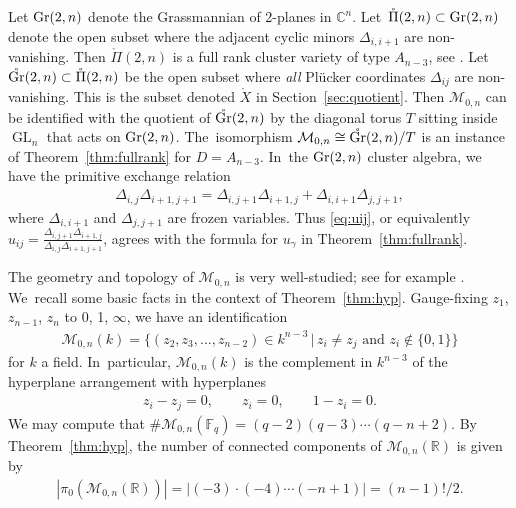 \documentclass[10pt,a4paper]{amsart}
\def\R{{\mathbb R}}
\def\C{{\mathbb C}}
\def\F{{\mathbb F}}
\def\Gr{{\rm Gr}}
\def\oPi{{\mathring{\Pi}}}
\def\oGr{{\mathring{\Gr}}}
\def\Xo{{\mathring{X}}}
\def\M{{\mathcal{M}}}
\def\GL{\operatorname{GL}}
\numberwithin{equation}{section}
\begin{document}
Let $\Gr(2,n)$ denote the Grassmannian of 2-planes in $\C^n$. Let~$\oPi(2,n)\subset \Gr(2,n)$ denote the open subset where the adjacent cyclic minors $\Delta_{i,i+1}$ are non-vanishing. Then $\oPi(2,n)$ is a full rank cluster variety of type $A_{n-3}$, see \cite[Section~12.2]{CA2}. Let~$\oGr(2,n) \subset \oPi(2,n)$ be the open subset where \emph{all} Pl\"ucker coordinates $\Delta_{ij}$ are non-vanishing. This is the subset denoted $\Xo$ in Section~\ref{sec:quotient}. Then $\M_{0,n}$ can be identified with the quotient of $\oGr(2,n)$ by the diagonal torus $T$ sitting inside $\GL_n$ that acts on $\Gr(2,n)$. The~isomorphism $\M_{0,n} \cong \oGr(2,n)/T$ is an instance of Theorem~\ref{thm:fullrank} for $D = A_{n-3}$. In~the $\Gr(2,n)$ cluster algebra, we have the primitive exchange relation
\begin{gather*}
\Delta_{i,j} \Delta_{i+1, j+1}= \Delta_{i, j+1}\Delta_{i+1,j} + \Delta_{i,i+1} \Delta_{j,j+1},
\end{gather*}
where $\Delta_{i,i+1}$ and $\Delta_{j,j+1}$ are frozen variables. Thus \eqref{eq:uij}, or equivalently $u_{ij} = \frac{ \Delta_{i, j+1}\Delta_{i+1,j} }{\Delta_{i,j} \Delta_{i+1, j+1}}$, agrees with the formula for $u_\gamma$ in Theorem~\ref{thm:fullrank}.

The geometry and topology of $\M_{0,n}$ is very well-studied; see for example \cite{Brown}. We~recall some basic facts in the context of Theorem~\ref{thm:hyp}. Gauge-fixing $z_1$, $z_{n-1}$, $z_n$ to 0, 1, $\infty$, we have an identification
\begin{gather*}
\M_{0,n}(k) = \big\{(z_2,z_3,\dots,z_{n-2})\in k^{n-3} \,|\, \mbox{$z_i \neq z_j$ and $z_i \notin \{0,1\}$}\big\}
\end{gather*}
for $k$ a field. In~particular, $\M_{0,n}(k)$ is the complement in $k^{n-3}$ of the hyperplane arrangement with hyperplanes
\begin{gather*}
z_i - z_j = 0, \qquad z_i = 0, \qquad 1-z_i =0.
\end{gather*}
We may compute that
$ \#\M_{0,n}(\F_q) = (q-2)(q-3)\cdots (q-n+2).
$
By Theorem~\ref{thm:hyp}, the number of connected components of $\M_{0,n}(\R)$ is given by
\begin{gather*}
|\pi_0(\M_{0,n}(\R))| = |(-3)\cdot (-4) \cdots (-n+1)| = (n-1)!/2.
\end{gather*}
\end{document}
